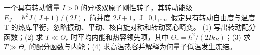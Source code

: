 一个具有转动惯量 \(I>0\) 的异核双原子刚性转子，其转动能级 \(E_J=\hbar^2J(J+1)/(2I)\)，简并度 \(2J+1\)，J=0,1,…。假定只有转动自由度与温度 T 的热库平衡，忽略振动、平动、核自旋对称和转动离心畸变。
(1) 写出转动配分函数；(2) 求 \(T\ll\Theta_r\) 时平均内能和热容领先项，其中 \(\Theta_r=\hbar^2/(2Ik_B)\)；(3) 求 \(T\gg\Theta_r\) 的配分函数与内能；(4) 求高温热容并解释为何量子低温发生冻结。
